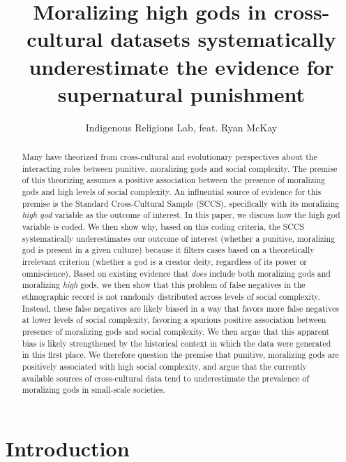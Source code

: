 \documentclass[
]{article}
\title{Moralizing high gods in cross-cultural datasets systematically underestimate the evidence for supernatural punishment}
\author{Indigenous Religions Lab, feat. Ryan McKay}
\date{}
\begin{document}
\maketitle
\begin{abstract}
Many have theorized from cross-cultural and evolutionary perspectives about the interacting roles between punitive, moralizing gods and social complexity. The premise of this theorizing assumes a positive association between the presence of moralizing gods and high levels of social complexity. An influential source of evidence for this premise is the Standard Cross-Cultural Sample (SCCS), specifically with its moralizing \emph{high god} variable as the outcome of interest. In this paper, we discuss how the high god variable is coded. We then show why, based on this coding criteria, the SCCS systematically underestimates our outcome of interest (whether a punitive, moralizing god is present in a given culture) because it filters cases based on a theoretically irrelevant criterion (whether a god is a creator deity, regardless of its power or omniscience). Based on existing evidence that \emph{does} include both moralizing gods and moralizing \emph{high} gods, we then show that this problem of false negatives in the ethnographic record is not randomly distributed across levels of social complexity. Instead, these false negatives are likely biased in a way that favors more false negatives at lower levels of social complexity, favoring a spurious positive association between presence of moralizing gods and social complexity. We then argue that this apparent bias is likely strengthened by the historical context in which the data were generated in this first place. We therefore question the premise that punitive, moralizing gods are positively associated with high social complexity, and argue that the currently available sources of cross-cultural data tend to underestimate the prevalence of moralizing gods in small-scale societies.
\end{abstract}

\section{Introduction}
\end{document}
